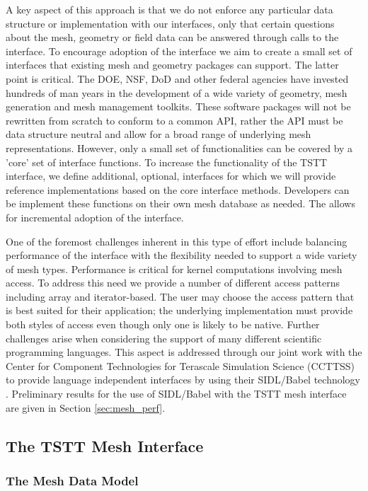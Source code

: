 A key aspect of this approach is that we do not enforce any particular
data structure or implementation with our interfaces, only that
certain questions about the mesh, geometry or field data can be
answered through calls to the interface.  To encourage adoption of the
interface we aim to create a small set of interfaces that existing
mesh and geometry packages can support.  The latter point is critical.
The DOE, NSF, DoD and other federal agencies have invested hundreds of
man years in the development of a wide variety of geometry, mesh
generation and mesh management toolkits.  These software packages will
not be rewritten from scratch to conform to a common API, rather the
API must be data structure neutral and allow for a broad range of
underlying mesh representations. However, only a small set of
functionalities can be covered by a 'core' set of interface functions.
To increase the functionality of the TSTT interface, we define
additional, optional, interfaces for which we will provide reference
implementations based on the core interface methods.  Developers can
be implement these functions on their own mesh database as needed.
The allows for incremental adoption of the interface.

One of the foremost challenges inherent in this type of effort include
balancing performance of the interface with the flexibility needed to
support a wide variety of mesh types.  Performance is critical for
kernel computations involving mesh access.  To address this need we
provide a number of different access patterns including array and
iterator-based.  The user may choose the access pattern that is best
suited for their application; the underlying implementation must
provide both styles of access even though only one is likely to be
native.  Further challenges arise when considering the support of many
different scientific programming languages.  This aspect is addressed
through our joint work with the Center for Component Technologies for
Terascale Simulation Science (CCTTSS) \cite{cca-forum} to provide
language independent interfaces by using their SIDL/Babel technology
\cite{babel}.  Preliminary results for the use of SIDL/Babel with
the TSTT mesh interface are given in Section \ref{sec:mesh_perf}.

\subsection{The TSTT Mesh Interface}

\subsubsection{The Mesh Data Model}
\label{sec:mesh}

